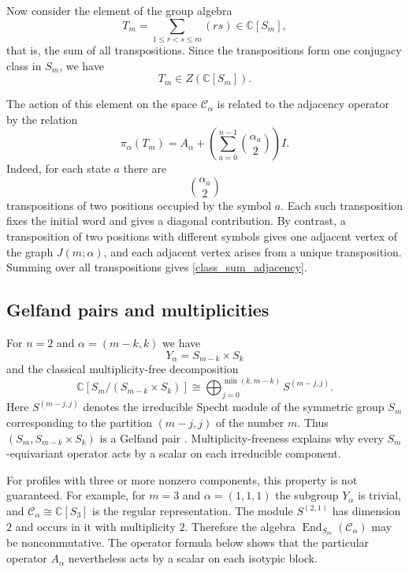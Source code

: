 \documentclass[12pt,reqno]{amsart}
\newcommand{\End}{\operatorname{End}}
\begin{document}
Now consider the element of the group algebra
$$
T_m
=
\sum_{1\le r<s\le m}(rs)
\in\mathbb C[S_m],
$$
that is, the sum of all transpositions. Since the transpositions form one
conjugacy class in $S_m$, we have
$$
T_m\in Z(\mathbb C[S_m]).
$$

The action of this element on the space $\mathcal C_\alpha$ is related to
the adjacency operator by the relation
\begin{equation}\label{class_sum_adjacency}
\pi_\alpha(T_m)
=
A_\alpha
+
\left(
\sum_{a=0}^{n-1}\binom{\alpha_a}{2}
\right)I.
\end{equation}
Indeed, for each state $a$ there are
$$
\binom{\alpha_a}{2}
$$
transpositions of two positions occupied by the symbol $a$. Each such
transposition fixes the initial word and gives a diagonal contribution. By
contrast, a transposition of two positions with different symbols gives
one adjacent vertex of the graph $J(m;\alpha)$, and each adjacent vertex
arises from a unique transposition. Summing over all transpositions gives
\eqref{class_sum_adjacency}.




\subsection{Gelfand pairs and multiplicities}

For $n=2$ and $\alpha=(m-k,k)$ we have
$$
Y_\alpha=S_{m-k}\times S_k
$$
and the classical multiplicity-free decomposition
\begin{equation*}
\mathbb C[S_m/(S_{m-k}\times S_k)]
\cong
\bigoplus_{j=0}^{\min(k,m-k)}S^{(m-j,j)}.
\end{equation*}
Here $S^{(m-j,j)}$ denotes the irreducible Specht module of the symmetric
group $S_m$ corresponding to the partition $(m-j,j)$ of the number $m$.
Thus $(S_m,S_{m-k}\times S_k)$ is a Gelfand pair
\cite{CeccheriniSilbersteinScarabottiTolli}. Multiplicity-freeness
explains why every $S_m$-equivariant operator acts by a scalar on each
irreducible component.

For profiles with three or more nonzero components, this property is not
guaranteed. For example, for $m=3$ and $\alpha=(1,1,1)$ the subgroup
$Y_\alpha$ is trivial, and
$
\mathcal C_\alpha\cong\mathbb C[S_3]
$
is the regular representation. The module $S^{(2,1)}$ has dimension $2$
and occurs in it with multiplicity $2$. Therefore the algebra
$\End_{S_m}(\mathcal C_\alpha)$ may be noncommutative. The operator
formula below shows that the particular operator $A_\alpha$ nevertheless
acts by a scalar on each isotypic block.
\end{document}
